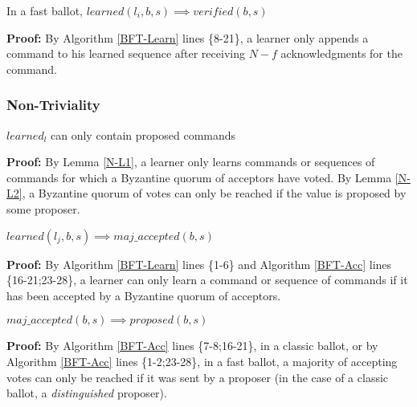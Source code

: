 \begin{lemma}
In a fast ballot, $learned(l_i,b,s) \implies verified(b,s)$ \label{C-L4} \par
\end{lemma}

\textbf{Proof:} By Algorithm \ref{BFT-Learn} lines \{8-21\}, a learner only appends a command to his learned sequence after receiving $N-f$ acknowledgments for the command. 

\subsubsection{Non-Triviality}
\begin{theorem}
$learned_l$ can only contain proposed commands \label{N-T1} \par
\end{theorem} 

\textbf{Proof:} By Lemma \ref{N-L1}, a learner only learns commands or sequences of commands for which a Byzantine quorum of acceptors have voted. By Lemma \ref{N-L2}, a Byzantine quorum of votes can only be reached if the value is proposed by some proposer.

\begin{lemma}
$learned(l_j,b,s) \implies maj\_accepted(b,s)$ \label{N-L1} \par
\end{lemma}

\textbf{Proof:} By Algorithm \ref{BFT-Learn} lines \{1-6\} and Algorithm \ref{BFT-Acc} lines \{16-21;23-28\}, a learner can only learn a command or sequence of commands if it has been accepted by a Byzantine quorum of acceptors.

\begin{lemma}
$maj\_accepted(b,s) \implies proposed(b,s)$ \label{N-L2} \par
\end{lemma}

\textbf{Proof:} By Algorithm \ref{BFT-Acc} lines \{7-8;16-21\}, in a classic ballot, or by Algorithm \ref{BFT-Acc} lines \{1-2;23-28\}, in a fast ballot, a majority of accepting votes can only be reached if it was sent by a proposer (in the case of a classic ballot, a \textit{distinguished} proposer).

